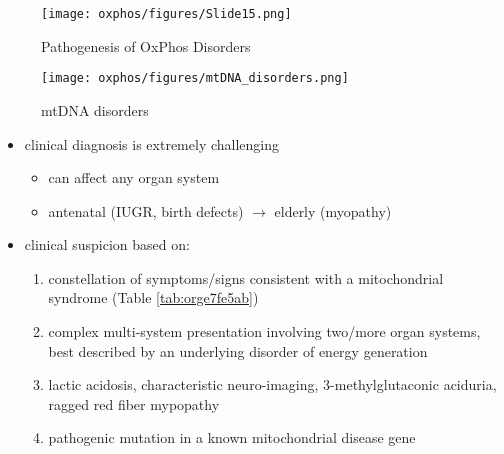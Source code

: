 \documentclass[12pt]{scrartcl}
\begin{document}
\begin{figure}[htbp]
\centering
\texttt{[image: oxphos/figures/Slide15.png]}
\caption[ETC]{\label{fig:org046f9da}Pathogenesis of OxPhos Disorders}
\end{figure}


\begin{figure}[htbp]
\centering
\texttt{[image: oxphos/figures/mtDNA\_disorders.png]}
\caption{\label{fig:org7841c21}mtDNA disorders}
\end{figure}

\begin{itemize}
\item clinical diagnosis is extremely challenging
\begin{itemize}
\item can affect any organ system
\item antenatal (IUGR, birth defects) \(\to\) elderly (myopathy)
\end{itemize}

\item clinical suspicion based on:
\begin{enumerate}
\item constellation of symptoms/signs consistent with a mitochondrial syndrome (Table \ref{tab:orge7fe5ab})
\item complex multi-system presentation involving two/more organ systems,
best described by an underlying disorder of energy generation
\item lactic acidosis, characteristic neuro-imaging, 3-methylglutaconic
aciduria, ragged red fiber mypopathy
\item pathogenic mutation in a known mitochondrial disease gene
\end{enumerate}
\end{itemize}
\end{document}
